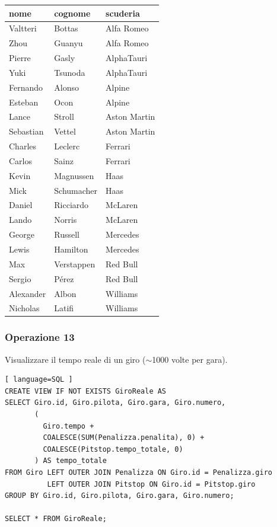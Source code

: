 \documentclass[11pt]{article}
\begin{document}
\begin{table}[!ht]
    \centering
    \begin{tabular}{|l|l|l|}
    \hline
        nome & cognome & scuderia \\ \hline
        Valtteri & Bottas & Alfa Romeo \\ \hline
        Zhou & Guanyu & Alfa Romeo \\ \hline
        Pierre & Gasly & AlphaTauri \\ \hline
        Yuki & Tsunoda & AlphaTauri \\ \hline
        Fernando & Alonso & Alpine \\ \hline
        Esteban & Ocon & Alpine \\ \hline
        Lance & Stroll & Aston Martin \\ \hline
        Sebastian & Vettel & Aston Martin \\ \hline
        Charles & Leclerc & Ferrari \\ \hline
        Carlos & Sainz & Ferrari \\ \hline
        Kevin & Magnussen & Haas \\ \hline
        Mick & Schumacher & Haas \\ \hline
        Daniel & Ricciardo & McLaren \\ \hline
        Lando & Norris & McLaren \\ \hline
        George & Russell & Mercedes \\ \hline
        Lewis & Hamilton & Mercedes \\ \hline
        Max & Verstappen & Red Bull \\ \hline
        Sergio & Pérez & Red Bull \\ \hline
        Alexander & Albon & Williams \\ \hline
        Nicholas & Latifi & Williams \\ \hline
    \end{tabular}
\end{table}


\subsubsection{Operazione 13}
Visualizzare il tempo reale di un giro ($\sim$1000 volte per gara).
\begin{lstlisting}[ language=SQL ]
CREATE VIEW IF NOT EXISTS GiroReale AS
SELECT Giro.id, Giro.pilota, Giro.gara, Giro.numero, 
       (
         Giro.tempo + 
         COALESCE(SUM(Penalizza.penalita), 0) + 
         COALESCE(Pitstop.tempo_totale, 0)
       ) AS tempo_totale
FROM Giro LEFT OUTER JOIN Penalizza ON Giro.id = Penalizza.giro
          LEFT OUTER JOIN Pitstop ON Giro.id = Pitstop.giro
GROUP BY Giro.id, Giro.pilota, Giro.gara, Giro.numero;

SELECT * FROM GiroReale;
\end{lstlisting}
\end{document}
